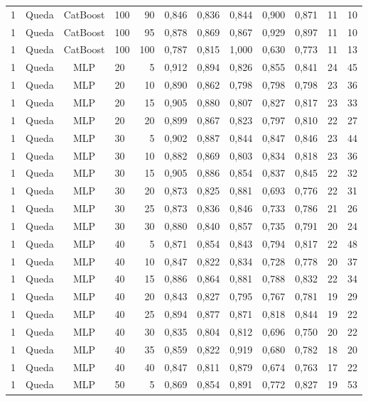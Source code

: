 \begin{longtable}{ccclrrrrrrrr}
1 & Queda & CatBoost & 100 & 90 & 0,846 & 0,836 & 0,844 & 0,900 & 0,871 & 11 & 10 \\
1 & Queda & CatBoost & 100 & 95 & 0,878 & 0,869 & 0,867 & 0,929 & 0,897 & 11 & 10 \\
1 & Queda & CatBoost & 100 & 100 & 0,787 & 0,815 & 1,000 & 0,630 & 0,773 & 11 & 13 \\
1 & Queda & MLP & 20 & 5 & 0,912 & 0,894 & 0,826 & 0,855 & 0,841 & 24 & 45 \\
1 & Queda & MLP & 20 & 10 & 0,890 & 0,862 & 0,798 & 0,798 & 0,798 & 23 & 36 \\
1 & Queda & MLP & 20 & 15 & 0,905 & 0,880 & 0,807 & 0,827 & 0,817 & 23 & 33 \\
1 & Queda & MLP & 20 & 20 & 0,899 & 0,867 & 0,823 & 0,797 & 0,810 & 22 & 27 \\
1 & Queda & MLP & 30 & 5 & 0,902 & 0,887 & 0,844 & 0,847 & 0,846 & 23 & 44 \\
1 & Queda & MLP & 30 & 10 & 0,882 & 0,869 & 0,803 & 0,834 & 0,818 & 23 & 36 \\
1 & Queda & MLP & 30 & 15 & 0,905 & 0,886 & 0,854 & 0,837 & 0,845 & 22 & 32 \\
1 & Queda & MLP & 30 & 20 & 0,873 & 0,825 & 0,881 & 0,693 & 0,776 & 22 & 31 \\
1 & Queda & MLP & 30 & 25 & 0,873 & 0,836 & 0,846 & 0,733 & 0,786 & 21 & 26 \\
1 & Queda & MLP & 30 & 30 & 0,880 & 0,840 & 0,857 & 0,735 & 0,791 & 20 & 24 \\
1 & Queda & MLP & 40 & 5 & 0,871 & 0,854 & 0,843 & 0,794 & 0,817 & 22 & 48 \\
1 & Queda & MLP & 40 & 10 & 0,847 & 0,822 & 0,834 & 0,728 & 0,778 & 20 & 37 \\
1 & Queda & MLP & 40 & 15 & 0,886 & 0,864 & 0,881 & 0,788 & 0,832 & 22 & 34 \\
1 & Queda & MLP & 40 & 20 & 0,843 & 0,827 & 0,795 & 0,767 & 0,781 & 19 & 29 \\
1 & Queda & MLP & 40 & 25 & 0,894 & 0,877 & 0,871 & 0,818 & 0,844 & 19 & 22 \\
1 & Queda & MLP & 40 & 30 & 0,835 & 0,804 & 0,812 & 0,696 & 0,750 & 20 & 22 \\
1 & Queda & MLP & 40 & 35 & 0,859 & 0,822 & 0,919 & 0,680 & 0,782 & 18 & 20 \\
1 & Queda & MLP & 40 & 40 & 0,847 & 0,811 & 0,879 & 0,674 & 0,763 & 17 & 22 \\
1 & Queda & MLP & 50 & 5 & 0,869 & 0,854 & 0,891 & 0,772 & 0,827 & 19 & 53 \\

\end{longtable}
